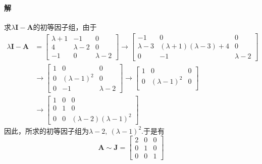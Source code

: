 \documentclass[12pt, a4paper, oneside, fontset=none]{ctexart}
\begin{document}
\paragraph*{解} 求$\lambda\bm{I} - \bm{A}$的初等因子组，由于
\begin{align*}
    \lambda\bm{I} - \bm{A} & =  \begin{bmatrix}
                                    \lambda + 1 & -1          & 0           \\
                                    4           & \lambda - 2 & 0           \\
                                    -1          & 0           & \lambda - 2
                                \end{bmatrix} \to \begin{bmatrix}
                                                      -1          & 0                              & 0           \\
                                                      \lambda - 3 & (\lambda + 1)(\lambda - 3) + 4 & 0           \\
                                                      0           & -1                             & \lambda - 2
                                                  \end{bmatrix} \\
                           & \to \begin{bmatrix}
                                     1 & 0               & 0           \\
                                     0 & (\lambda - 1)^2 & 0           \\
                                     0 & -1              & \lambda - 2
                                 \end{bmatrix} \to \begin{bmatrix}
                                                       1 & 0               & 0 \\
                                                       0 & (\lambda - 1)^2 & 0 \\
                                                   \end{bmatrix}                                   \\
                           & \to \begin{bmatrix}
                                     1 & 0 & 0                            \\
                                     0 & 1 & 0                            \\
                                     0 & 0 & (\lambda - 2)(\lambda - 1)^2
                                 \end{bmatrix}
\end{align*}
因此，所求的初等因子组为$\lambda - 2,\ (\lambda - 1)^2.$于是有
\[
    \bm{A} \sim \bm{J} = \begin{bmatrix}
        2 & 0 & 0 \\
        0 & 1 & 0 \\
        0 & 0 & 1
    \end{bmatrix}
\]
\end{document}
